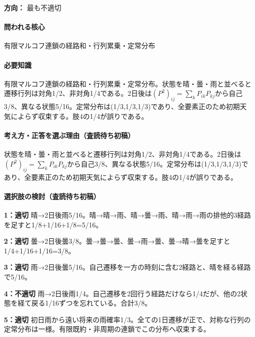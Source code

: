\noindent\textbf{方向：} 最も不適切\par

\paragraph{問われる核心} 有限マルコフ連鎖の経路和・行列累乗・定常分布

\paragraph{必要知識} 有限マルコフ連鎖の経路和・行列累乗・定常分布。状態を晴・曇・雨と並べると遷移行列は対角1/2、非対角1/4である。2日後は\((P^2)_{ij}=\sum_kP_{ik}P_{kj}\)から自己3/8、異なる状態5/16。定常分布は(1/3,1/3,1/3)であり、全要素正のため初期天気によらず収束する。肢4の1/4が誤りである。

\paragraph{考え方・正答を選ぶ理由（査読待ち初稿）} 状態を晴・曇・雨と並べると遷移行列は対角1/2、非対角1/4である。2日後は\((P^2)_{ij}=\sum_kP_{ik}P_{kj}\)から自己3/8、異なる状態5/16。定常分布は(1/3,1/3,1/3)であり、全要素正のため初期天気によらず収束する。肢4の1/4が誤りである。

\paragraph{選択肢の検討（査読待ち初稿）}\mbox{}\par

\noindent\textbf{1：適切} 晴→2日後雨5/16。晴→晴→雨、晴→曇→雨、晴→雨→雨の排他的3経路を足すと1/8+1/16+1/8=\allowbreak{}5/16。\par

\noindent\textbf{2：適切} 曇→2日後曇3/8。曇→曇→曇、曇→雨→曇、曇→晴→曇を足すと1/4+1/16+1/16=\allowbreak{}3/8。\par

\noindent\textbf{3：適切} 雨→2日後曇5/16。自己遷移を一方の時刻に含む2経路と、晴を経る経路で5/16。\par

\noindent\textbf{4：不適切} 雨→2日後雨1/4。自己遷移を2回行う経路だけなら1/4だが、他の2状態を経て戻る1/16ずつを忘れている。合計3/8。\par

\noindent\textbf{5：適切} 初日雨から遠い将来の雨確率1/3。全ての1日遷移が正で、対称な行列の定常分布は一様。有限既約・非周期の連鎖でこの分布へ収束する。\par

